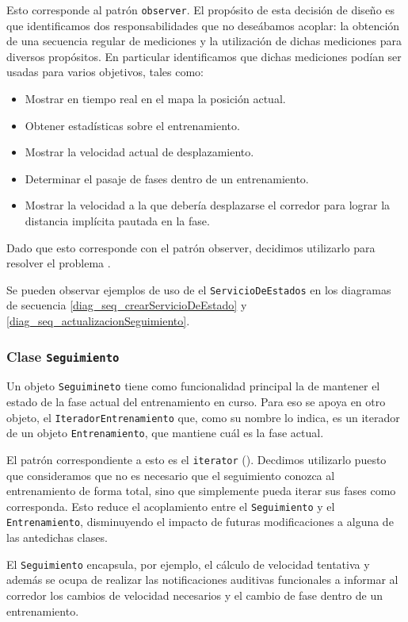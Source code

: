 \documentclass[10pt, a4paper,english,spanish]{article}
\begin{document}
Esto corresponde al patrón \texttt{observer}. El propósito de esta decisión de diseño es que identificamos dos responsabilidades que no deseábamos acoplar: la obtención de una secuencia regular de mediciones y la utilización de dichas mediciones para diversos propósitos. En particular identificamos que dichas mediciones podían ser usadas para varios objetivos, tales como:
\begin{itemize}
	\item Mostrar en tiempo real en el mapa la posición actual.
	\item Obtener estadísticas sobre el entrenamiento.
	\item Mostrar la velocidad actual de desplazamiento.
	\item Determinar el pasaje de fases dentro de un entrenamiento.
	\item Mostrar la velocidad a la que debería desplazarse el corredor para lograr la distancia implícita pautada en la fase.
\end{itemize}
Dado que esto corresponde con el patrón observer, decidimos utilizarlo para resolver el problema \cite{Gamma}.

Se pueden observar ejemplos de uso de el \texttt{ServicioDeEstados} en los diagramas de secuencia \ref{diag_seq_crearServicioDeEstado} y \ref{diag_seq_actualizacionSeguimiento}. 

\subsubsection{Clase \texttt{Seguimiento}}
Un objeto \texttt{Seguimineto} tiene como funcionalidad principal la de mantener el estado de la fase actual del entrenamiento en curso. Para eso se apoya en otro objeto, el \texttt{IteradorEntrenamiento} que, como su nombre lo indica, es un iterador de un objeto \texttt{Entrenamiento}, que mantiene cuál es la fase actual. 

El patrón correspondiente a esto es el \texttt{iterator} (\cite{Gamma}). Decdimos utilizarlo puesto que consideramos que no es necesario que el seguimiento conozca al entrenamiento de forma total, sino que simplemente pueda iterar sus fases como corresponda. Esto reduce el acoplamiento entre el \texttt{Seguimiento} y el \texttt{Entrenamiento}, disminuyendo el impacto de futuras modificaciones a alguna de las antedichas clases.

El \texttt{Seguimiento} encapsula, por ejemplo, el cálculo de velocidad tentativa y además se ocupa de realizar las notificaciones auditivas funcionales a informar al corredor los cambios de velocidad necesarios y el cambio de fase dentro de un entrenamiento.
\end{document}
